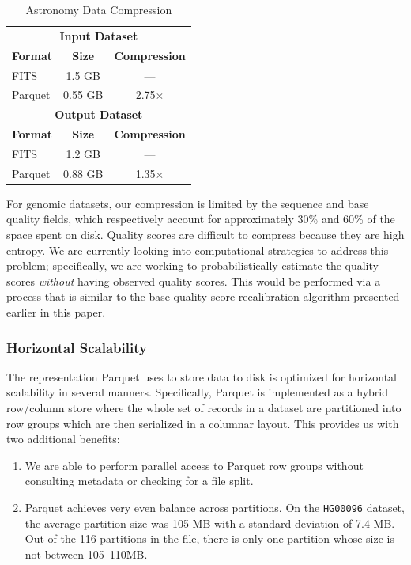 \documentclass{acm_proc_article-sp}
\begin{document}
\begin{table}[h]
\caption{Astronomy Data Compression}
\label{tab:astro-compression}
\begin{center}
\begin{tabular}{ l c c }
\hline
\multicolumn{3}{c}{\bf Input Dataset} \\
\bf Format & \bf Size & \bf Compression \\
\hline
\hline
FITS & 1.5 GB & --- \\
Parquet & 0.55 GB & 2.75$\times$ \\
\hline
\multicolumn{3}{c}{\bf Output Dataset} \\
\bf Format & \bf Size & \bf Compression \\
\hline
\hline
FITS & 1.2 GB & --- \\
Parquet & 0.88 GB & 1.35$\times$ \\
\hline
\end{tabular}
\end{center}
\end{table}

For genomic datasets, our compression is limited by the sequence and base quality fields, which respectively
account for approximately 30\% and 60\% of the space spent on disk. Quality scores are difficult to compress
because they are high entropy. We are currently looking into computational strategies to address this problem;
specifically, we are working to probabilistically estimate the quality scores \emph{without} having observed quality
scores. This would be performed via a process that is similar to the base quality score recalibration algorithm
presented earlier in this paper.

\subsubsection{Horizontal Scalability}
\label{sec:horizontal-scalability}

The representation Parquet uses to store data to disk is optimized for horizontal scalability in several manners.
Specifically, Parquet is implemented as a hybrid row/column store where the whole set of records in a dataset
are partitioned into row groups which are then serialized in a columnar layout. This provides us with two additional
benefits:

\begin{enumerate}
\item We are able to perform parallel access to Parquet row groups without consulting metadata or checking for
a file split.
\item Parquet achieves very even balance across partitions. On the \texttt{HG00096} dataset, the average
partition size was 105 MB with a standard deviation of 7.4 MB. Out of the 116 partitions in the file, there is only
one partition whose size is not between 105--110MB.
\end{enumerate}
\end{document}
